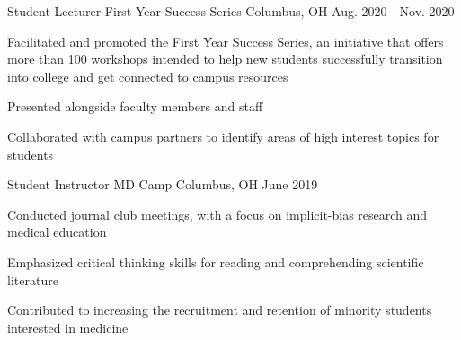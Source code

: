 

\begin{cventries}

  \cventry
    {Student Lecturer} %
    {First Year Success Series} %
    {Columbus, OH} %
    {Aug. 2020 - Nov. 2020} %
    {
      \begin{cvitems} %
        \item {Facilitated and promoted the First Year Success Series, an initiative that offers more than 100 workshops intended to help new students successfully transition into college and get connected to campus resources}
        \item {Presented alongside faculty members and staff}
        \item {Collaborated with campus partners to identify areas of high interest topics for students}
      \end{cvitems}
    }

  \cventry
    {Student Instructor} %
    {MD Camp} %
    {Columbus, OH} %
    {June 2019} %
    {
      \begin{cvitems} %
        \item {Conducted journal club meetings, with a focus on implicit-bias research and medical education}
        \item {Emphasized critical thinking skills for reading and comprehending scientific literature}
        \item{Contributed to increasing the recruitment and retention of minority students interested in medicine}
      \end{cvitems}
    }
\end{cventries}